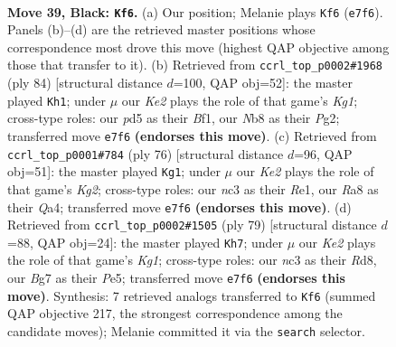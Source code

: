 \documentclass[11pt]{article}
\begin{document}
\clearpage

\begin{figure}[p]\centering
\begin{subfigure}{0.46\textwidth}\centering
\resizebox{\linewidth}{!}{%
\newchessgame
\chessboard[
  setfen={rn2R3/3nk1b1/p2p4/3P3Q/6P1/q1N5/4N3/4K3 b - - 9 39},
  showmover=false,
  pgfstyle=straightmove, color=movearrow, markmove={e7-f6}
]}
\caption{}
\end{subfigure}\hfill
\begin{subfigure}{0.46\textwidth}\centering
\resizebox{\linewidth}{!}{%
\newchessgame
\chessboard[
  setfen={1r4k1/5pp1/1p6/8/3N4/P4Nqn/1Q4P1/5BK1 w - - 0 43},
  showmover=false,
  pgfstyle=straightmove, color=movearrow, markmove={g1-h1}
]}
\caption{}
\end{subfigure}
\\[4pt]
\begin{subfigure}{0.46\textwidth}\centering
\resizebox{\linewidth}{!}{%
\newchessgame
\chessboard[
  setfen={6k1/1p1q2p1/7p/1P1p4/Q2N1r1n/5P2/6KN/4R3 w - - 0 39},
  showmover=false,
  pgfstyle=straightmove, color=movearrow, markmove={g2-g1}
]}
\caption{}
\end{subfigure}\hfill
\begin{subfigure}{0.46\textwidth}\centering
\resizebox{\linewidth}{!}{%
\newchessgame
\chessboard[
  setfen={3r1nk1/1q4p1/7p/4p3/R1Q1P3/3nP1PP/3N3N/6K1 b - - 1 40},
  showmover=false,
  pgfstyle=straightmove, color=movearrow, markmove={g8-h7}
]}
\caption{}
\end{subfigure}
\caption{\textbf{Move 39, Black: \texttt{Kf6}.} (a) Our position; Melanie plays \texttt{Kf6} (\texttt{e7f6}). Panels (b)--(d) are the retrieved master positions whose correspondence most drove this move (highest QAP objective among those that transfer to it). (b) Retrieved from \texttt{ccrl\_top\_p0002\#1968} (ply 84) [structural distance $d$=100, QAP obj=52]: the master played \texttt{Kh1}; under $\mu$ our \emph{Ke2} plays the role of that game's \emph{Kg1}; cross-type roles: our \emph{p}d5 as their \emph{B}f1, our \emph{N}b8 as their \emph{P}g2; transferred move \texttt{e7f6} \textbf{(endorses this move)}. (c) Retrieved from \texttt{ccrl\_top\_p0001\#784} (ply 76) [structural distance $d$=96, QAP obj=51]: the master played \texttt{Kg1}; under $\mu$ our \emph{Ke2} plays the role of that game's \emph{Kg2}; cross-type roles: our \emph{n}c3 as their \emph{R}e1, our \emph{R}a8 as their \emph{Q}a4; transferred move \texttt{e7f6} \textbf{(endorses this move)}. (d) Retrieved from \texttt{ccrl\_top\_p0002\#1505} (ply 79) [structural distance $d$=88, QAP obj=24]: the master played \texttt{Kh7}; under $\mu$ our \emph{Ke2} plays the role of that game's \emph{Kg1}; cross-type roles: our \emph{n}c3 as their \emph{R}d8, our \emph{B}g7 as their \emph{P}e5; transferred move \texttt{e7f6} \textbf{(endorses this move)}. Synthesis: 7 retrieved analogs transferred to \texttt{Kf6} (summed QAP objective 217, the strongest correspondence among the candidate moves); Melanie committed it via the \texttt{search} selector.}
\label{fig:thought-m77}
\end{figure}
\end{document}
